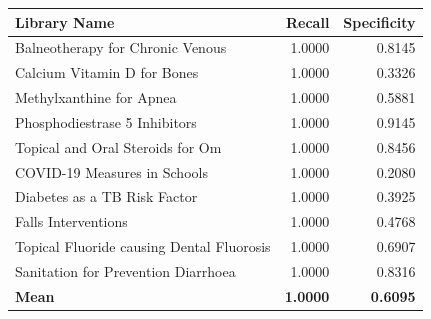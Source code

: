 \begin{tabularx}{\textwidth}{@{} X r r @{}}
\toprule
\textbf{Library Name} & \textbf{Recall} & \textbf{Specificity} \\
\midrule
Balneotherapy for Chronic Venous & 1.0000 & 0.8145 \\
Calcium Vitamin D for Bones & 1.0000 & 0.3326 \\
Methylxanthine for Apnea & 1.0000 & 0.5881 \\
Phosphodiestrase 5 Inhibitors & 1.0000 & 0.9145 \\
Topical and Oral Steroids for Om & 1.0000 & 0.8456 \\
COVID-19 Measures in Schools & 1.0000 & 0.2080 \\
Diabetes as a TB Risk Factor & 1.0000 & 0.3925 \\
Falls Interventions & 1.0000 & 0.4768 \\
Topical Fluoride causing Dental Fluorosis & 1.0000 & 0.6907 \\
Sanitation for Prevention Diarrhoea & 1.0000 & 0.8316 \\
\midrule
\textbf{Mean} & \textbf{1.0000} & \textbf{0.6095} \\
\bottomrule
\end{tabularx}